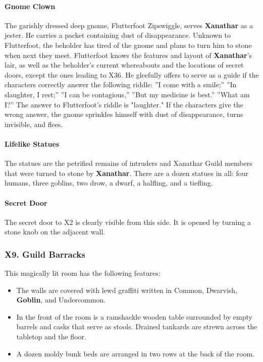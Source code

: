 \documentclass[10pt,a4paper,twoside,twocolumn,openany,nodeprecatedcode]{dndbook}
\begin{document}
\paragraph{Gnome Clown}
The garishly dressed deep gnome, Flutterfoot Zipswiggle, serves \textbf{Xanathar} as a jester. He carries a packet containing dust of disappearance. Unknown to Flutterfoot, the beholder has tired of the gnome and plans to turn him to stone when next they meet.
Flutterfoot knows the features and layout of \textbf{Xanathar}'s lair, as well as the beholder's current whereabouts and the locations of secret doors, except the ones leading to X36. He gleefully offers to serve as a guide if the characters correctly answer the following riddle:
\DndQuote%
{}
{''I come with a smile;''}
{''In slaughter, I rest;''}
{''I can be contagious,''}
{''But my medicine is best.''}
{''What am I?''}
{}
The answer to Flutterfoot's riddle is "laughter." If the characters give the wrong answer, the gnome sprinkles himself with dust of disappearance, turns invisible, and flees.
\paragraph{Lifelike Statues}
The statues are the petrified remains of intruders and Xanathar Guild members that were turned to stone by \textbf{Xanathar}. There are a dozen statues in all: four humans, three goblins, two drow, a dwarf, a halfling, and a tiefling.
\paragraph{Secret Door}
The secret door to X2 is clearly visible from this side. It is opened by turning a stone knob on the adjacent wall.
\subsubsection{X9. Guild Barracks}
This magically lit room has the following features:
\begin{itemize}

\item The walls are covered with lewd graffiti written in Common, Dwarvish, \textbf{Goblin}, and Undercommon.
\item In the front of the room is a ramshackle wooden table surrounded by empty barrels and casks that serve as stools. Drained tankards are strewn across the tabletop and the floor.
\item A dozen moldy bunk beds are arranged in two rows at the back of the room.
\end{itemize}
\end{document}
